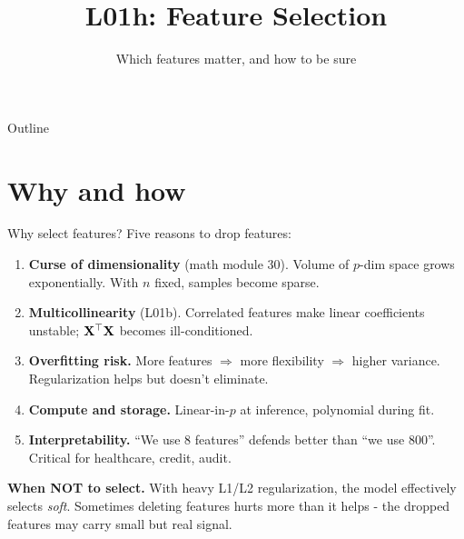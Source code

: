 \documentclass[aspectratio=169]{beamer}
\title{L01h: Feature Selection}
\subtitle{Which features matter, and how to be sure}
\date{}
\begin{document}
\begin{frame}{Outline}
  \tableofcontents
\end{frame}

\section{Why and how}

\begin{frame}{Why select features?}
  Five reasons to drop features:
  \begin{enumerate}
    \item \textbf{Curse of dimensionality} (math module 30). Volume of $p$-dim space grows exponentially. With $n$ fixed, samples become sparse.
    \item \textbf{Multicollinearity} (L01b). Correlated features make linear coefficients unstable; $\mathbf{X}^\top \mathbf{X}$ becomes ill-conditioned.
    \item \textbf{Overfitting risk.} More features $\Rightarrow$ more flexibility $\Rightarrow$ higher variance. Regularization helps but doesn't eliminate.
    \item \textbf{Compute and storage.} Linear-in-$p$ at inference, polynomial during fit.
    \item \textbf{Interpretability.} ``We use 8 features'' defends better than ``we use 800''. Critical for healthcare, credit, audit.
  \end{enumerate}
  \vfill
  \textbf{When NOT to select.} With heavy L1/L2 regularization, the model effectively selects \emph{soft}. Sometimes deleting features hurts more than it helps - the dropped features may carry small but real signal.
\end{frame}
\end{document}
